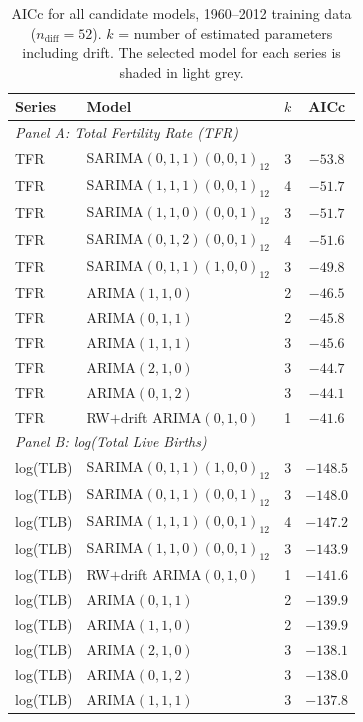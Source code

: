 \documentclass[12pt,a4paper]{article}
\begin{document}
\begin{table}[H]
\centering
\caption{AICc for all candidate models, 1960--2012 training data ($n_{\text{diff}}=52$).
  $k$ = number of estimated parameters including drift. The selected model for each
  series is shaded in light grey.}
\label{tab:candidates}
\small
\begin{tabular}{llcc}
\toprule
Series & Model & $k$ & AICc \\
\midrule
\multicolumn{4}{l}{\textit{Panel A: Total Fertility Rate (TFR)}} \\[2pt]
TFR & \cellcolor{gray!15}SARIMA$(0,1,1)(0,0,1)_{12}$ & \cellcolor{gray!15}3 & \cellcolor{gray!15}$-53.8$ \\
TFR & SARIMA$(1,1,1)(0,0,1)_{12}$ & 4 & $-51.7$ \\
TFR & SARIMA$(1,1,0)(0,0,1)_{12}$ & 3 & $-51.7$ \\
TFR & SARIMA$(0,1,2)(0,0,1)_{12}$ & 4 & $-51.6$ \\
TFR & SARIMA$(0,1,1)(1,0,0)_{12}$ & 3 & $-49.8$ \\
TFR & ARIMA$(1,1,0)$              & 2 & $-46.5$ \\
TFR & ARIMA$(0,1,1)$              & 2 & $-45.8$ \\
TFR & ARIMA$(1,1,1)$              & 3 & $-45.6$ \\
TFR & ARIMA$(2,1,0)$              & 3 & $-44.7$ \\
TFR & ARIMA$(0,1,2)$              & 3 & $-44.1$ \\
TFR & RW$+$drift ARIMA$(0,1,0)$   & 1 & $-41.6$ \\
\midrule
\multicolumn{4}{l}{\textit{Panel B: log(Total Live Births)}} \\[2pt]
log(TLB) & SARIMA$(0,1,1)(1,0,0)_{12}$ & 3 & $-148.5$ \\
log(TLB) & \cellcolor{gray!15}SARIMA$(0,1,1)(0,0,1)_{12}$ & \cellcolor{gray!15}3 & \cellcolor{gray!15}$-148.0$ \\
log(TLB) & SARIMA$(1,1,1)(0,0,1)_{12}$ & 4 & $-147.2$ \\
log(TLB) & SARIMA$(1,1,0)(0,0,1)_{12}$ & 3 & $-143.9$ \\
log(TLB) & \cellcolor{gray!15}RW$+$drift ARIMA$(0,1,0)$   & \cellcolor{gray!15}1 & \cellcolor{gray!15}$-141.6$ \\
log(TLB) & ARIMA$(0,1,1)$              & 2 & $-139.9$ \\
log(TLB) & ARIMA$(1,1,0)$              & 2 & $-139.9$ \\
log(TLB) & ARIMA$(2,1,0)$              & 3 & $-138.1$ \\
log(TLB) & ARIMA$(0,1,2)$              & 3 & $-138.0$ \\
log(TLB) & ARIMA$(1,1,1)$              & 3 & $-137.8$ \\
\bottomrule
\end{tabular}
\end{table}
\end{document}

